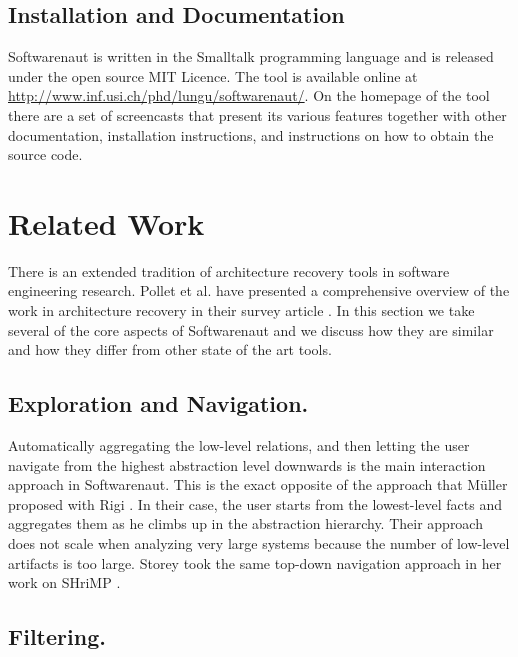 \documentclass[preprint,12pt]{elsarticle}
\begin{document}
\subsection {Installation and Documentation}
Softwarenaut is written in the Smalltalk programming language and is released under the open source MIT Licence. The tool is available online at {\footnotesize \url{http://www.inf.usi.ch/phd/lungu/softwarenaut/}}. On the homepage of the tool there are a set of screencasts that present its various features together with other documentation, installation instructions, and instructions on how to obtain the source code. 


\newpage
\section {Related Work}
\label {sec:rel}

There is an extended tradition of architecture recovery tools in software engineering research. Pollet et al. have presented a comprehensive overview of the work in architecture recovery in their survey article \cite{pollet-sar}. In this section we take several of the core aspects of Softwarenaut and we discuss how they are similar and how they differ from other state of the art tools.

\subsection {Exploration and Navigation.} Automatically aggregating the low-level relations, and then letting the user navigate from the highest abstraction level downwards is the main interaction approach in Softwarenaut. This is the exact opposite of the approach that M{\"u}ller proposed with Rigi \cite{muller-revengenv}. In their case, the user starts from the lowest-level facts and aggregates them as he climbs up in the abstraction hierarchy. Their approach does not scale when analyzing very large systems because the number of low-level artifacts is too large. Storey took the same top-down navigation approach in her work on SHriMP \cite{storey-shrimp}.

\subsection {Filtering.} 
\end{document}
